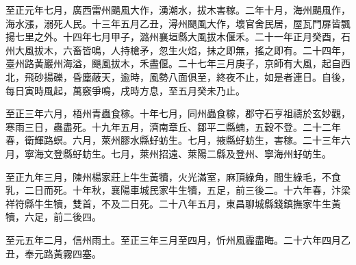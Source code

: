 \begin{pinyinscope}
 至正元年七月，廣西雷州颶風大作，湧潮水，拔木害稼。二年十月，海州颶風作，海水漲，溺死人民。十三年五月乙丑，潯州颶風大作，壞官舍民居，屋瓦門扉皆飄揚七里之外。十四年七月甲子，潞州襄垣縣大風拔木偃禾。二十一年正月癸酉，石州大風拔木，六畜皆鳴，人持槍矛，忽生火焰，抹之即無，搖之即有。二十四年，臺州路黃巖州海溢，颶風拔木，禾盡偃。二十七年三月庚子，京師有大風，起自西北，飛砂揚礫，昏塵蔽天，逾時，風勢八面俱至，終夜不止，如是者連日。自後，每日寅時風起，萬竅爭鳴，戌時方息，至五月癸未乃止。



 至正三年六月，梧州青蟲食稼。十年七月，同州蟲食稼，郡守石亨祖禱於玄妙觀，寒雨三日，蟲盡死。十九年五月，濟南章丘、鄒平二縣蝻，五穀不登。二十二年春，衛輝路螟。六月，萊州膠水縣虸蚄生。七月，掖縣虸蚄生，害稼。二十三年六月，寧海文登縣虸蚄生。七月，萊州招遠、萊陽二縣及登州、寧海州虸蚄生。



 至正九年三月，陳州楊家莊上牛生黃犢，火光滿室，麻頂綠角，間生綠毛，不食乳，二日而死。十年秋，襄陽車城民家牛生犢，五足，前三後二。十六年春，汴梁祥符縣牛生犢，雙首，不及二日死。二十八年五月，東昌聊城縣錢鎮撫家牛生黃犢，六足，前二後四。



 至元五年二月，信州雨土。至正三年三月至四月，忻州風霾盡晦。二十六年四月乙丑，奉元路黃霧四塞。




\end{pinyinscope}
